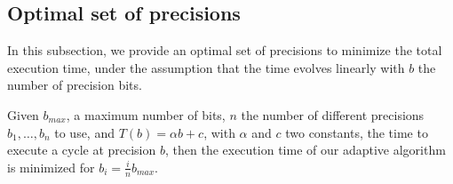    \subsection{Optimal set of precisions}
   
   In this subsection, we provide an optimal set of precisions to minimize the total execution time, under the assumption that the time evolves linearly with $b$ the number of precision bits.
   
   \begin{theorem}
     Given $b_{max}$, a maximum number of bits, $n$ the number of different precisions $b_1,\dots,b_n$ to use, and $T(b)=\alpha b+c$, with $\alpha$ and $c$ two constants, the time to execute a cycle at precision $b$, then
     the execution time of our adaptive algorithm is minimized for $b_i = \frac{i}{n}b_{max}$.
   \end{theorem}

